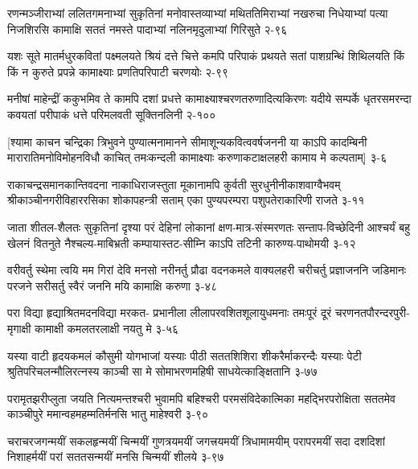 
\annofourlineindentedshloka
{रणन्मञ्जीराभ्यां ललितगमनाभ्यां सुकृतिनां}
{मनोवास्तव्याभ्यां मथिततिमिराभ्यां नखरुचा}
{निधेयाभ्यां पत्या निजशिरसि कामाक्षि सततं}
{नमस्ते पादाभ्यां नलिनमृदुलाभ्यां गिरिसुते}
{२-९६}

\annofourlineindentedshloka
{यशः सूते मातर्मधुरकवितां पक्ष्मलयते}
{श्रियं दत्ते चित्ते कमपि परिपाकं प्रथयते}
{सतां पाशग्रन्थिं शिथिलयति किं किं न कुरुते}
{प्रपन्ने कामाक्ष्याः प्रणतिपरिपाटी चरणयोः}
{२-९९}


\annofourlineindentedshloka
{मनीषां माहेन्द्रीं ककुभमिव ते कामपि दशां}
{प्रधत्ते कामाक्ष्याश्चरणतरुणादित्यकिरणः}
{यदीये सम्पर्के धृतरसमरन्दा कवयतां}
{परीपाकं धत्ते परिमलवती सूक्तिनलिनी}
{२-१००}

\annofourlineindentedshloka
{[श्यामा काचन चन्द्रिका त्रिभुवने पुण्यात्मनामानने}
{सीमाशून्यकवित्ववर्षजननी या काऽपि कादम्बिनी}
{मारारातिमनोविमोहनविधौ काचित् तमःकन्दली}
{कामाक्ष्याः करुणाकटाक्षलहरी कामाय मे कल्पताम्]}
{३-६}

\annofourlineindentedshloka
{राकाचन्द्रसमानकान्तिवदना नाकाधिराजस्तुता}
{मूकानामपि कुर्वती सुरधुनीनीकाशवाग्वैभवम्}
{श्रीकाञ्चीनगरीविहाररसिका शोकापहन्त्री सताम्}
{एका पुण्यपरम्परा पशुपतेराकारिणी राजते}
{३-११}

\annofourlineindentedshloka
{जाता शीतल-शैलतः सुकृतिनां दृश्या परं देहिनां}
{लोकानां क्षण-मात्र-संस्मरणतः सन्ताप-विच्छेदिनी}
{आश्चर्यं बहु खेलनं वितनुते नैश्चल्य-माबिभ्रती}
{कम्पायास्तट-सीम्नि काऽपि तटिनी कारुण्य-पाथोमयी}
{३-१२}


\annofourlineindentedshloka
{वरीवर्तु स्थेमा त्वयि मम गिरां देवि मनसो}
{नरीनर्तु प्रौढा वदनकमले वाक्यलहरी}
{चरीचर्तु प्रज्ञाजननि जडिमानः परजने}
{सरीसर्तु स्वैरं जननि मयि कामाक्षि करुणा}
{३-४८}


\annofourlineindentedshloka
{परा विद्या हृद्याश्रितमदनविद्या मरकत-}
{प्रभानीला लीलापरवशितशूलायुधमनाः}
{तमःपूरं दूरं चरणनतपौरन्दरपुरी-}
{मृगाक्षी कामाक्षी कमलतरलाक्षी नयतु मे}
{३-५६}

\annofourlineindentedshloka
{यस्या वाटी हृदयकमलं कौसुमी योगभाजां}
{यस्याः पीठी सततशिशिरा शीकरैर्माकरन्दैः}
{यस्याः पेटी श्रुतिपरिचलन्मौलिरत्नस्य काञ्ची}
{सा मे सोमाभरणमहिषी साधयेत्काङ्क्षितानि}
{३-७७}

\annofourlineindentedshloka
{परामृतझरीप्लुता जयति नित्यमन्तश्चरी}
{भुवामपि बहिश्चरी परमसंविदेकात्मिका}
{महद्भिरपरोक्षिता सततमेव काञ्चीपुरे}
{ममान्वहमहम्मतिर्मनसि भातु माहेश्वरी}
{३-९०}

\annofourlineindentedshloka
{चराचरजगन्मयीं सकलहृन्मयीं चिन्मयीं}
{गुणत्रयमयीं जगत्त्रयमयीं त्रिधामामयीम्}
{परापरमयीं सदा दशदिशां निशाहर्मयीं}
{परां सततसन्मयीं मनसि चिन्मयीं शीलये}
{३-९७}

